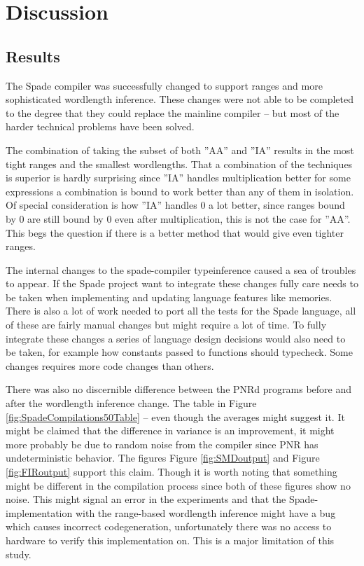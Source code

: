 \chapter{Discussion}
\label{cha:Discussion}

\section{Results}
The Spade compiler was successfully changed to support ranges and more sophisticated wordlength inference. These changes were not able to be completed to the degree that they could replace the mainline compiler -- but most of the harder technical problems have been solved. 

The combination of taking the subset of both ''AA'' and ''IA'' results in the most tight ranges and the smallest wordlengths. That a combination of the techniques is superior is hardly surprising since ''IA'' handles multiplication better for some expressions a combination is bound to work better than any of them in isolation. Of special consideration is how ''IA'' handles $0$ a lot better, since ranges bound by 0 are still bound by $0$ even after multiplication, this is not the case for ''AA''. This begs the question if there is a better method that would give even tighter ranges.

The internal changes to the spade-compiler typeinference caused a sea of troubles to appear. If the Spade project want to integrate these changes fully care needs to be taken when implementing and updating language features like memories. There is also a lot of work needed to port all the tests for the Spade language, all of these are fairly manual changes but might require a lot of time. To fully integrate these changes a series of language design decisions would also need to be taken, for example how constants passed to functions should typecheck. Some changes requires more code changes than others.

There was also no discernible difference between the PNRd programs before and after the wordlength inference change. The table in Figure \ref{fig:SpadeCompilations50Table} -- even though the averages might suggest it. It might be claimed that the difference in variance is an improvement, it might more probably be due to random noise from the compiler since PNR has undeterministic behavior. The figures Figure \ref{fig:SMDoutput} and Figure \ref{fig:FIRoutput} support this claim. Though it is worth noting that something might be different in the compilation process since both of these figures show no noise. This might signal an error in the experiments and that the Spade-implementation with the range-based wordlength inference might have a bug which causes incorrect codegeneration, unfortunately there was no access to hardware to verify this implementation on. This is a major limitation of this study.

